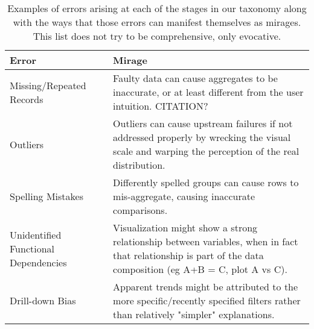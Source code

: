 
\begin{table*}[]
\centering
\caption{Examples of errors arising at each of the stages in our taxonomy along with the ways that those errors can manifest themselves as mirages. This list does not try to be comprehensive, only evocative.}
\small
\begin{tabular}{p{5cm}p{12cm}}
\normalsize{Error} & \normalsize{Mirage}\\ \hline
   \rowcolor{colora}\multirow{5}{0em}{\hspace{-0.6cm}\rotatebox{90}{\normalsize{Curating}}}Missing/Repeated Records & Faulty data can cause aggregates to be inaccurate, or at least different from the user intuition. \cite{kim2003taxonomy}  CITATION?\\
 \rowcolor{colora-opaque}Outliers & Outliers can cause upstream failures if not addressed properly by wrecking the visual scale and warping the perception of the real distribution.  \\
 \rowcolor{colora}Spelling Mistakes & Differently spelled groups can cause rows to mis-aggregate, causing inaccurate comparisons. \cite{wang2019uni}\\
 \rowcolor{colora-opaque}Unidentified Functional Dependencies & Visualization might show a strong relationship between variables, when in fact that relationship is part of the data composition (eg A+B = C, plot A vs C). \\
 \rowcolor{colora}Drill-down Bias & Apparent trends might be attributed to the more specific/recently specified filters rather than relatively "simpler" explanations. \cite{lee2019avoiding}\\


\end{tabular}
\end{table*}
